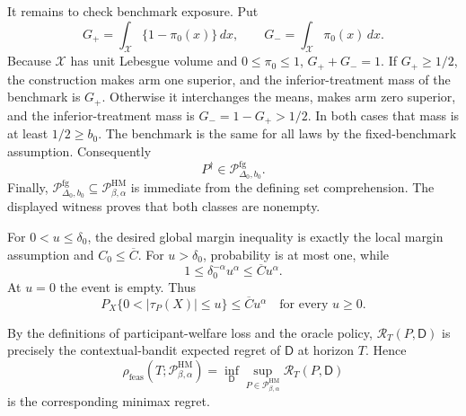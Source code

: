 It remains to check benchmark exposure.  Put
\[
G_+=\int_{\mathcal X}\{1-\pi_0(x)\}\,dx,
\qquad
G_-=\int_{\mathcal X}\pi_0(x)\,dx.
\]
Because \(\mathcal X\) has unit Lebesgue volume and \(0\leq\pi_0\leq1\), \(G_++G_-=1\).  If \(G_+\geq1/2\), the construction makes arm one superior, and the inferior-treatment mass of the benchmark is \(G_+\).  Otherwise it interchanges the means, makes arm zero superior, and the inferior-treatment mass is \(G_-=1-G_+>1/2\).  In both cases that mass is at least \(1/2\geq b_0\).  The benchmark is the same for all laws by the fixed-benchmark assumption.  Consequently
\[
P^\dagger\in\mathcal P_{\Delta_0,b_0}^{\mathrm{fg}}.
\]
Finally, \(\mathcal P_{\Delta_0,b_0}^{\mathrm{fg}}\subseteq\mathcal P_{\beta,\alpha}^{\mathrm{HM}}\) is immediate from the defining set comprehension.  The displayed witness proves that both classes are nonempty.

For \(0<u\leq\delta_0\), the desired global margin inequality is exactly the local margin assumption and \(C_0\leq\overline C\).  For \(u>\delta_0\), probability is at most one, while
\[
1\leq\delta_0^{-\alpha}u^\alpha\leq\overline C u^\alpha.
\]
At \(u=0\) the event is empty.  Thus
\[
P_X\{0<|\tau_P(X)|\leq u\}\leq\overline C u^\alpha
\quad\text{for every }u\geq0.
\]

By the definitions of participant-welfare loss and the oracle policy, \(\mathcal R_T(P,\mathsf D)\) is precisely the contextual-bandit expected regret of \(\mathsf D\) at horizon \(T\).  Hence
\[
\rho_{\mathrm{feas}}(T;\mathcal P_{\beta,\alpha}^{\mathrm{HM}})
=\inf_{\mathsf D}\sup_{P\in\mathcal P_{\beta,\alpha}^{\mathrm{HM}}}
\mathcal R_T(P,\mathsf D)
\]
is the corresponding minimax regret.

